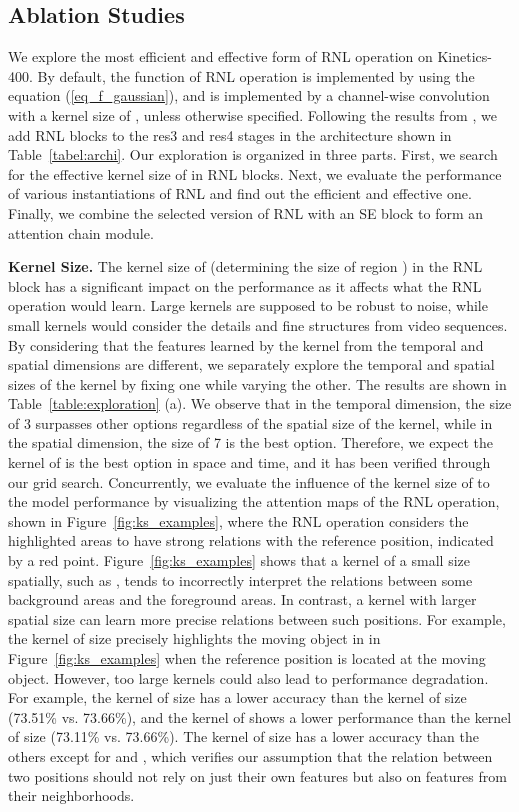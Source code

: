 \documentclass[a4paper,conference]{IEEEtran}
\begin{document}
\subsection{Ablation Studies}

\label{sec_exploration}
 We explore the most efficient and effective form of RNL operation on Kinetics-400. By default, the function  of RNL operation is implemented by using the equation (\ref{eq_f_gaussian}), and  is implemented by a channel-wise convolution with a kernel size of , unless otherwise specified. Following the results from \cite{wang2018non}, we add RNL blocks to the res3 and res4 stages in the architecture shown in Table~\ref{tabel:archi}.
 Our exploration is organized in three parts. First, we search for the effective kernel size of  in RNL blocks. Next, we evaluate the performance of various instantiations of RNL and find out the efficient and effective one. 
Finally, we combine the selected version of RNL with an SE block to form an attention chain module.


\noindent \textbf{Kernel Size.} The kernel size of  (determining the size of region ) in the RNL block has a significant impact on the performance as it affects what the RNL operation would learn. Large kernels are supposed to be robust to noise, while small kernels would consider the details and fine structures from video sequences. By considering that the features learned by the kernel from the temporal and spatial dimensions are different, we separately explore the temporal and spatial sizes of the kernel by fixing one while varying the other. The results are shown in Table~\ref{table:exploration} (a). We observe that in the temporal dimension, the size of 3 surpasses other options regardless of the spatial size of the kernel, while in the spatial dimension, the size of 7 is the best option. Therefore, we expect the kernel of  is the best option in space and time, and it has been verified through our grid search. Concurrently, we evaluate the influence of the kernel size of  to the model performance by visualizing the attention maps of the RNL operation, shown in Figure~\ref{fig:ks_examples}, where the RNL operation considers the highlighted areas to have strong relations with the reference position, indicated by a red point. Figure~\ref{fig:ks_examples} shows that a kernel of a small size spatially, such as , tends to incorrectly interpret the relations between some background areas and the foreground areas. In contrast, a kernel with larger spatial size can learn more precise relations between such positions. For example, the kernel of size  precisely highlights the moving object in in Figure~\ref{fig:ks_examples} when the reference position is located at the moving object. However, too large kernels could also lead to performance degradation. For example, the kernel of size  has a lower accuracy than the kernel of size  (73.51\% vs. 73.66\%), and the kernel of  shows a lower performance than the kernel of size  (73.11\% vs. 73.66\%). The kernel of size  has a lower accuracy than the others except for  and , which verifies our assumption that the relation between two positions should not rely on just their own features but also on features from their neighborhoods.
\end{document}
